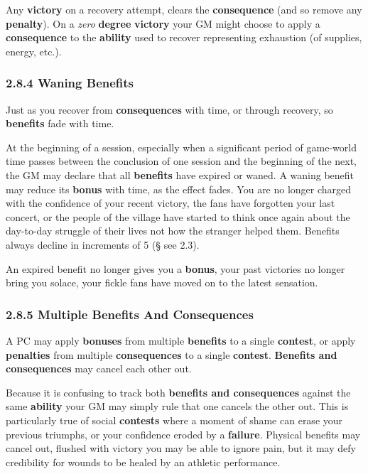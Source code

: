 \documentclass[
  11pt,
]{article}
\begin{document}
Any \textbf{victory} on a recovery attempt, clears the
\textbf{consequence} (and so remove any \textbf{penalty}). On a
\emph{zero} \textbf{degree} \textbf{victory} your GM might choose to
apply a \textbf{consequence} to the \textbf{ability} used to recover
representing exhaustion (of supplies, energy, etc.).

\hypertarget{waning-benefits}{%
\subsubsection{2.8.4 Waning Benefits}\label{waning-benefits}}

Just as you recover from \textbf{consequences} with time, or through
recovery, so \textbf{benefits} fade with time.

At the beginning of a session, especially when a significant period of
game-world time passes between the conclusion of one session and the
beginning of the next, the GM may declare that all \textbf{benefits}
have expired or waned. A waning benefit may reduce its \textbf{bonus}
with time, as the effect fades. You are no longer charged with the
confidence of your recent victory, the fans have forgotten your last
concert, or the people of the village have started to think once again
about the day-to-day struggle of their lives not how the stranger helped
them. Benefits always decline in increments of 5 (§ see 2.3).

An expired benefit no longer gives you a \textbf{bonus}, your past
victories no longer bring you solace, your fickle fans have moved on to
the latest sensation.

\hypertarget{multiple-benefits-and-consequences}{%
\subsubsection{2.8.5 Multiple Benefits And
Consequences}\label{multiple-benefits-and-consequences}}

A PC may apply \textbf{bonuses} from multiple \textbf{benefits} to a
single \textbf{contest}, or apply \textbf{penalties} from multiple
\textbf{consequences} to a single \textbf{contest}. \textbf{Benefits and
consequences} may cancel each other out.

Because it is confusing to track both \textbf{benefits and consequences}
against the same \textbf{ability} your GM may simply rule that one
cancels the other out. This is particularly true of social
\textbf{contests} where a moment of shame can erase your previous
triumphs, or your confidence eroded by a \textbf{failure}. Physical
benefits may cancel out, flushed with victory you may be able to ignore
pain, but it may defy credibility for wounds to be healed by an athletic
performance.
\end{document}
